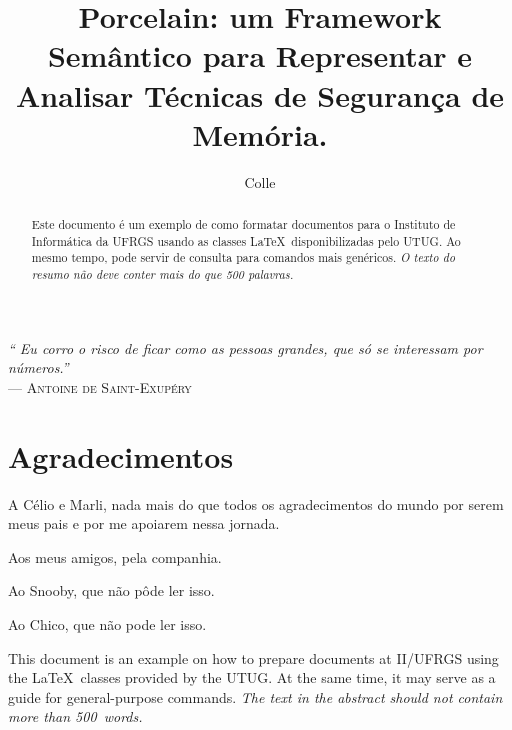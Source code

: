 \documentclass[cic,tc]{iiufrgs}
\title{Porcelain: um Framework Semântico para Representar e Analisar Técnicas de Segurança de Memória.}
\author{Colle}{Pedro Henrique Boniatti}
\begin{document}
\maketitle

 \clearpage
 \begin{flushright}
     \mbox{}\vfill
     {\sffamily\itshape
       ``
       Eu corro o risco de ficar como as pessoas grandes, 
	   que só se interessam por números.''\\
     }
     --- \textsc{Antoine de Saint-Exupéry}
 \end{flushright}

\chapter*{Agradecimentos}
A Célio e Marli, nada mais do que todos os agradecimentos 
do mundo por serem meus pais e por me apoiarem nessa jornada. 

Aos meus amigos, pela companhia.

Ao Snooby, que não pôde ler isso.

Ao Chico, que não pode ler isso.


\begin{abstract}
    Este documento é um exemplo de como formatar documentos para o
    Instituto de Informática da UFRGS usando as classes \LaTeX\
    disponibilizadas pelo UTUG\@. Ao mesmo tempo, pode servir de consulta
    para comandos mais genéricos. \emph{O texto do resumo não deve
        conter mais do que 500 palavras.}
\end{abstract}

\begin{translatedabstract}
    This document is an example on how to prepare documents at II/UFRGS
    using the \LaTeX\ classes provided by the UTUG\@. At the same time, it
    may serve as a guide for general-purpose commands. \emph{The text in
        the abstract should not contain more than 500~words.}
\end{translatedabstract}

\listoffigures

\listoftables
\end{document}

